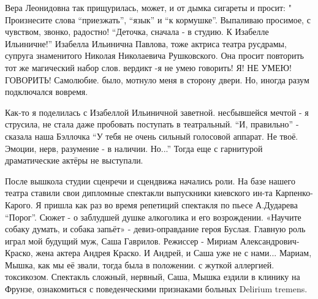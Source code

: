 \raggedcolumns
\begin{multicols}{2} %
\setlength{\parindent}{0pt}




\end{multicols} %

Вера Леонидовна так прищурилась, может, и
от дымка сигареты и просит: " Произнесите слова \enquote{приезжать}, \enquote{язык} и \enquote{к
кормушке}. Выпаливаю просимое, с чувством, звонко, радостно!  \enquote{Деточка, сначала
- в студию. К Изабелле Ильиничне!} Изабелла Ильинична Павлова, тоже актриса
театра русдрамы, супруга знаменитого Николая Николаевича Рушковского.  Она
просит повторить тот же магический набор слов. вердикт -я не умею говорить! Я!
НЕ УМЕЮ! ГОВОРИТЬ! Самолюбие. было, мотнуло меня в сторону двери. Но, иногда
разум подключался вовремя. 


Как-то я поделилась с Изабеллой Ильиничной заветной. несбывшейся мечтой - я
струсила, не стала даже пробовать поступать в театральный. \enquote{И, правильно} -
сказала наша Бэллочка  \enquote{У тебя не очень сильный голосовой аппарат. Не твоё.
Эмоции, нерв, разумение - в наличии. Но...}   Тогда еще с гарнитурой
драматические актёры не выступали.

\raggedcolumns
\begin{multicols}{3} %
\setlength{\parindent}{0pt}



\end{multicols} %

После вышкола студии сценречи и сцендвижа начались роли. На базе нашего театра
ставили свои  дипломные спектакли выпускники киевского ин-та Карпенко-Карого.
Я пришла как раз во время репетиций спектакля по пьесе А.Дударева \enquote{Порог}.
Сюжет - о заблудшей душке алкоголика и его возрождении. «Научите собаку думать,
и собака запьёт» - девиз-оправдание героя Буслая.  Главную роль играл мой
будущий муж, Саша Гаврилов. Режиссер - Мириам Александрович-Краско, жена актера
Андрея Краско. И Андрей, и Саша уже не с нами... Мариам, Мышка, как мы её
звали, тогда была в положении. с жуткой аллергией. токсикозом. Спектакль
сложный, нервный, Саша, Мышка  ездили в клинику на Фрунзе, ознакомиться с
поведенческими признаками больных Delirium tremens. 

